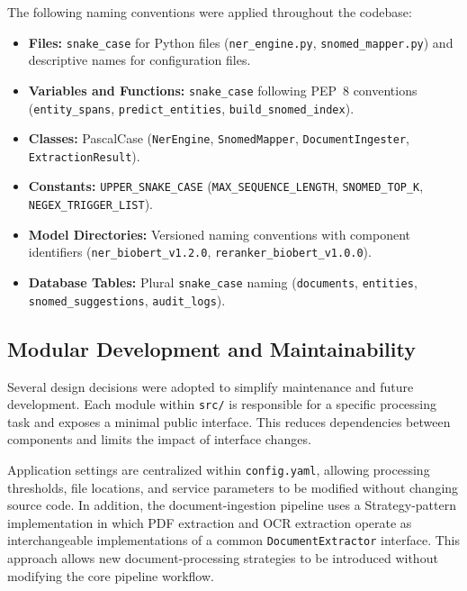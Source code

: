 The following naming conventions were applied throughout the codebase:

\begin{itemize}

\item \textbf{Files:} \texttt{snake\_case} for Python files (\texttt{ner\_engine.py}, \texttt{snomed\_mapper.py}) and descriptive names for configuration files.

\item \textbf{Variables and Functions:} \texttt{snake\_case} following PEP~8 conventions (\texttt{entity\_spans}, \texttt{predict\_entities}, \texttt{build\_snomed\_index}).

\item \textbf{Classes:} PascalCase (\texttt{NerEngine}, \texttt{SnomedMapper}, \texttt{DocumentIngester}, \texttt{ExtractionResult}).

\item \textbf{Constants:} \texttt{UPPER\_SNAKE\_CASE} (\texttt{MAX\_SEQUENCE\_LENGTH}, \texttt{SNOMED\_TOP\_K}, \texttt{NEGEX\_TRIGGER\_LIST}).

\item \textbf{Model Directories:} Versioned naming conventions with component identifiers (\texttt{ner\_biobert\_v1.2.0}, \texttt{reranker\_biobert\_v1.0.0}).

\item \textbf{Database Tables:} Plural \texttt{snake\_case} naming (\texttt{documents}, \texttt{entities}, \texttt{snomed\_suggestions}, \texttt{audit\_logs}).

\end{itemize}

\subsection{Modular Development and Maintainability}

Several design decisions were adopted to simplify maintenance and future development. Each module within \texttt{src/} is responsible for a specific processing task and exposes a minimal public interface. This reduces dependencies between components and limits the impact of interface changes.

Application settings are centralized within \texttt{config.yaml}, allowing processing thresholds, file locations, and service parameters to be modified without changing source code. In addition, the document-ingestion pipeline uses a Strategy-pattern implementation in which PDF extraction and OCR extraction operate as interchangeable implementations of a common \texttt{DocumentExtractor} interface. This approach allows new document-processing strategies to be introduced without modifying the core pipeline workflow.

